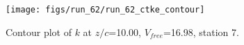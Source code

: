 \begin{figure}[H]
\centering
\texttt{[image: figs/run\_62/run\_62\_ctke\_contour]}
\caption{Contour plot of $k$ at $z/c$=10.00, $V_{free}$=16.98, station 7.}
\end{figure}


